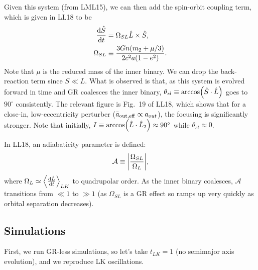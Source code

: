 \documentclass[11pt,
        usenames, %
        dvipsnames %
    ]{article}
\newcommand*{\rd}[2]{\frac{\mathrm{d}#1}{\mathrm{d}#2}}
\DeclarePairedDelimiter\abs{\lvert}{\rvert}
\DeclarePairedDelimiter\ev{\langle}{\rangle}
\DeclarePairedDelimiter\p{\lparen}{\rparen}
\begin{document}
Given this system (from LML15), we can then add the spin-orbit coupling term,
which is given in LL18 to be
\begin{align}
    \rd{\hat{S}}{t} &= \Omega_{SL}\hat{L} \times \hat{S},\\
    \Omega_{SL} &\equiv \frac{3Gn\p*{m_2 + \mu/3}}{2c^2a\p*{1 - e^2}}.
\end{align}
Note that $\mu$ is the reduced mass of the inner binary. We can drop the
back-reaction term since $S \ll L$. What is observed is that, as this system
is evolved forward in time and GR coalesces the inner binary, $\theta_{sl}
\equiv \arccos\p*{\hat{S} \cdot \hat{L}}$ goes to $90^\circ$ consistently. The
relevant figure is Fig.~19 of LL18, which shows that for a close-in,
low-eccentricity perturber ($\bar{a}_{\rm out, eff} \propto a_{out}$), the
focusing is significantly stronger. Note that initially, $I \equiv
\arccos\p*{\hat{L} \cdot \hat{L}_2} \approx 90^\circ$ while $\theta_{sl}
\approx 0$.

In LL18, an adiabaticity parameter is defined:
\begin{equation}
    \mathcal{A} \equiv \abs*{\frac{\Omega_{SL}}{\Omega_L}},
\end{equation}
where $\Omega_{L} \simeq \ev*{\rd{\hat{L}}{t}}_{LK}$ to quadrupolar order. As
the inner binary coalesces, $\mathcal{A}$ transitions from $\ll 1$ to $\gg 1$
(as $\Omega_{SL}$ is a GR effect so ramps up very quickly as orbital separation
decreases).

\subsection{Simulations}

First, we run GR-less simulations, so let's take $t_{LK} = 1$ (no semimajor axis
evolution), and we reproduce LK oscillations.
\end{document}
